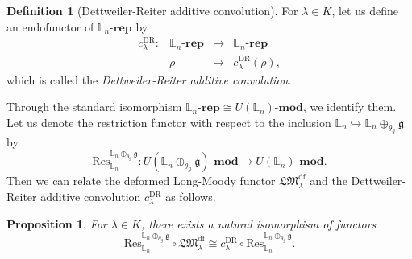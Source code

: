 \documentclass[a4paper,12pt]{article}
\newtheorem{prop}[thm]{Proposition}
\theoremstyle{definition}
\newtheorem{df}[thm]{Definition}
\theoremstyle{remark}
\begin{document}
\begin{df}[Dettweiler-Reiter additive convolution]
	For $\lambda\in K$, let us define an endofunctor 
	of $\mathbb{L}_{n}\text{-}\mathbf{rep}$ by 
	\[
		\begin{array}{cccc}
			c^{\mathrm{DR}}_{\lambda}\colon &\mathbb{L}_{n}\text{-}\mathbf{rep}&
			\longrightarrow &\mathbb{L}_{n}\text{-}\mathbf{rep}\\
			&\rho&\longmapsto&c^{\mathrm{DR}}_{\lambda}(\rho),
		\end{array}
	\]
	which is called the \emph{Dettweiler-Reiter additive convolution}.
\end{df}
Through the standard isomorphism 
$\mathbb{L}_{n}\text{-}\mathbf{rep}\cong 
U(\mathbb{L}_{n})\text{-}\mathbf{mod}$,
we identify them.
Let us denote the restriction functor with respect to the inclusion $\mathbb{L}_{n}\hookrightarrow \mathbb{L}_{n}\oplus_{\theta_{g}}\mathfrak{g}$ 
by 
\[
	\mathrm{Res}_{\mathbb{L}_{n}}^{\mathbb{L}_{n}\oplus_{\theta_{g}}\mathfrak{g}}
	\colon U(\mathbb{L}_{n}\oplus_{\theta_{g}}\mathfrak{g})\text{-}\mathbf{mod}
	\longrightarrow U(\mathbb{L}_{n})\text{-}\mathbf{mod}.
\]
Then we can relate the deformed Long-Moody functor $\mathfrak{LM}^{\mathrm{df}}_{\lambda}$ and the Dettweiler-Reiter additive convolution $c^{\mathrm{DR}}_{\lambda}$ as follows.
\begin{prop}\label{prop:compconv}
For $\lambda\in K$, there exists a natural isomorphism of functors
\[
	\mathrm{Res}_{\mathbb{L}_{n}}^{\mathbb{L}_{n}\oplus_{\theta_{g}}\mathfrak{g}}\circ \mathfrak{LM}^{\mathrm{df}}_{\lambda}
	\cong c^{\mathrm{DR}}_{\lambda}\circ \mathrm{Res}_{\mathbb{L}_{n}}^{\mathbb{L}_{n}\oplus_{\theta_{g}}\mathfrak{g}}.
\]
\end{prop}
\end{document}
